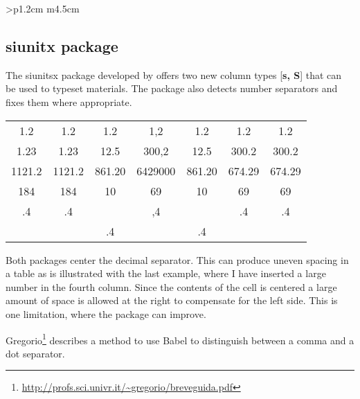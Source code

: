 \begin{tabular}{>{\bfseries}p{1.2cm} m{4.5cm}}

\subsection{siunitx package}

The siunitsx package developed by offers two new column types [\textbf{s, S}] that can be used to typeset materials. The package also detects number separators and fixes them where appropriate.

\begin{tabular}{|S |S |S |S |S |S |S|}
 1.2     	& 1.2   		&1.2    		&1,2    	&1.2    	&1.2	&1.2     \\
 1.23   	& 1.23  		&12.5   		&300,2  &12.5   	&300.2	&300.2   \\
 1121.2	& 1121.2	&861.20 	&6429000  &861.20 &674.29&674.29  \\
 184    	& 184   		&10     		&69     	&10     	&69	&69      \\
 .4      	& .4    		&       		&,4     	&       	&.4 	&.4     \\
         	&       		&.4     		&		&.4     	&		& 
\end{tabular}

Both packages center the decimal separator. This can produce uneven spacing in a table as is illustrated with the last example, where I have inserted a large number in the fourth column. Since the contents of the cell is centered a large amount of space is allowed at the right to compensate for the left side. This is one limitation, where the package can improve. 
 
Gregorio\footnote{\url{http://profs.sci.univr.it/~gregorio/breveguida.pdf}} describes a method to use Babel to distinguish between a comma and a dot separator.


\end{tabular}
